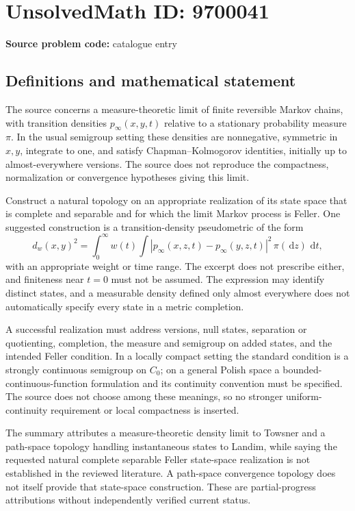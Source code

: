 \documentclass[11pt]{article}
\newcommand{\dd}{\,\mathrm{d}}
\begin{document}
\section*{UnsolvedMath ID: 9700041}
\textbf{Source problem code:} catalogue entry
\subsection{Definitions and mathematical statement}
The source concerns a measure-theoretic limit of finite reversible Markov chains, with transition densities \(p_\infty(x,y,t)\) relative to a stationary probability measure \(\pi\). In the usual semigroup setting these densities are nonnegative, symmetric in \(x,y\), integrate to one, and satisfy Chapman--Kolmogorov identities, initially up to almost-everywhere versions. The source does not reproduce the compactness, normalization or convergence hypotheses giving this limit.

Construct a natural topology on an appropriate realization of its state space that is complete and separable and for which the limit Markov process is Feller. One suggested construction is a transition-density pseudometric of the form
\[
 d_w(x,y)^2=\int_0^\infty w(t)
 \int|p_\infty(x,z,t)-p_\infty(y,z,t)|^2\,\pi(\dd z)\,\dd t,
\]
with an appropriate weight or time range. The excerpt does not prescribe either, and finiteness near \(t=0\) must not be assumed. The expression may identify distinct states, and a measurable density defined only almost everywhere does not automatically specify every state in a metric completion.

A successful realization must address versions, null states, separation or quotienting, completion, the measure and semigroup on added states, and the intended Feller condition. In a locally compact setting the standard condition is a strongly continuous semigroup on \(C_0\); on a general Polish space a bounded-continuous-function formulation and its continuity convention must be specified. The source does not choose among these meanings, so no stronger uniform-continuity requirement or local compactness is inserted.

The summary attributes a measure-theoretic density limit to Towsner and a path-space topology handling instantaneous states to Landim, while saying the requested natural complete separable Feller state-space realization is not established in the reviewed literature. A path-space convergence topology does not itself provide that state-space construction. These are partial-progress attributions without independently verified current status.
\end{document}
